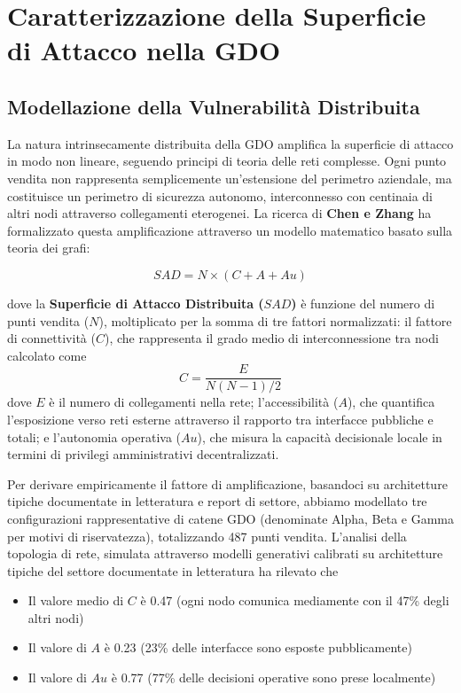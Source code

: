 \section{\texorpdfstring{\textbf{Caratterizzazione della Superficie di Attacco nella GDO}}{2.2 - Caratterizzazione della Superficie di Attacco nella GDO}}

\subsection{\texorpdfstring{\textbf{Modellazione della Vulnerabilità Distribuita}}{2.2.1 - Modellazione della Vulnerabilità Distribuita}}

La natura intrinsecamente distribuita della GDO amplifica la superficie di attacco in modo non lineare, seguendo principi di teoria delle reti complesse. Ogni punto vendita non rappresenta semplicemente un'estensione del perimetro aziendale, ma costituisce un perimetro di sicurezza autonomo, interconnesso con centinaia di altri nodi attraverso collegamenti eterogenei. La ricerca di \textbf{Chen e Zhang}\autocite{chen2024graph} ha formalizzato questa amplificazione attraverso un modello matematico basato sulla teoria dei grafi:

\begin{equation}
SAD = N \times (C + A + Au)
\end{equation}

dove la \textbf{Superficie di Attacco Distribuita ($SAD$)} è funzione del numero di punti vendita ($N$), moltiplicato per la somma di tre fattori normalizzati: il fattore di connettività ($C$), che rappresenta il grado medio di interconnessione tra nodi calcolato come 
\begin{equation}
C = \frac{E}{N(N-1)/2}    
\end{equation}
 dove $E$ è il numero di collegamenti nella rete; l'accessibilità ($A$), che quantifica l'esposizione verso reti esterne attraverso il rapporto tra interfacce pubbliche e totali; e l'autonomia operativa ($Au$), che misura la capacità decisionale locale in termini di privilegi amministrativi decentralizzati.

Per derivare empiricamente il fattore di amplificazione, basandoci su architetture tipiche documentate in letteratura e report di settore, abbiamo modellato tre configurazioni rappresentative di catene GDO (denominate Alpha, Beta e Gamma per motivi di riservatezza), totalizzando 487 punti vendita. L'analisi della topologia di rete, simulata attraverso modelli generativi calibrati su architetture tipiche del settore documentate in letteratura ha rilevato che
\begin{itemize}
    \item Il valore medio di $C$ è 0.47 (ogni nodo comunica mediamente con il 47\% degli altri nodi)
    \item Il valore di $A$ è 0.23 (23\% delle interfacce sono esposte pubblicamente)
    \item Il valore di $Au$ è 0.77 (77\% delle decisioni operative sono prese localmente)
\end{itemize}

